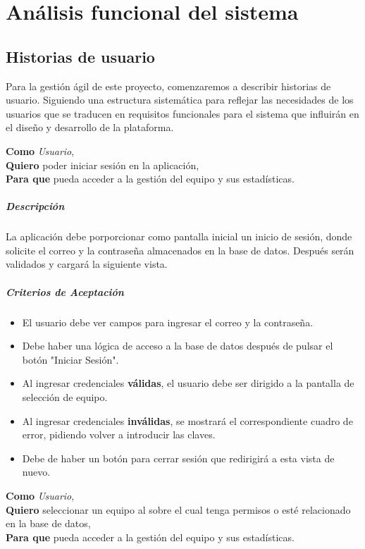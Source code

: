 \section{Análisis funcional del sistema}
\subsection{Historias de usuario}
Para la gestión ágil de este proyecto, comenzaremos a describir historias de usuario. Siguiendo una estructura sistemática para reflejar las necesidades de los usuarios que se traducen en requisitos funcionales para el sistema que influirán en el diseño y desarrollo de la plataforma.

\begin{tcolorbox}[title= Inicio de sesión]
\textbf{Como} \textit{Usuario},\\
\textbf{Quiero} poder iniciar sesión en la aplicación,\\
\textbf{Para que} pueda acceder a la gestión del equipo y sus estadísticas.
\end{tcolorbox}

\subparagraph{Descripción}
La aplicación debe porporcionar como pantalla inicial un inicio de sesión, donde solicite el correo y la contraseña almacenados en la base de datos. Después serán validados y cargará la siguiente vista.

\subparagraph{Criterios de Aceptación}
\begin{itemize}
\item El usuario debe ver campos para ingresar el correo y la contraseña.
\item Debe haber una lógica de acceso a la base de datos después de pulsar el botón "Iniciar Sesión".
\item Al ingresar credenciales \textbf{válidas}, el usuario debe ser dirigido a la pantalla de selección de equipo.
\item Al ingresar credenciales \textbf{inválidas}, se mostrará el correspondiente cuadro de error, pidiendo volver a introducir las claves.
\item Debe de haber un botón para cerrar sesión que redirigirá a esta vista de nuevo.
\end{itemize}
\begin{tcolorbox}[title= Seleccionar el Equipo]
\textbf{Como} \textit{Usuario},\\
\textbf{Quiero} seleccionar un equipo al sobre el cual tenga permisos o esté relacionado en la base de datos,\\
\textbf{Para que} pueda acceder a la gestión del equipo y sus estadísticas.
\end{tcolorbox}

